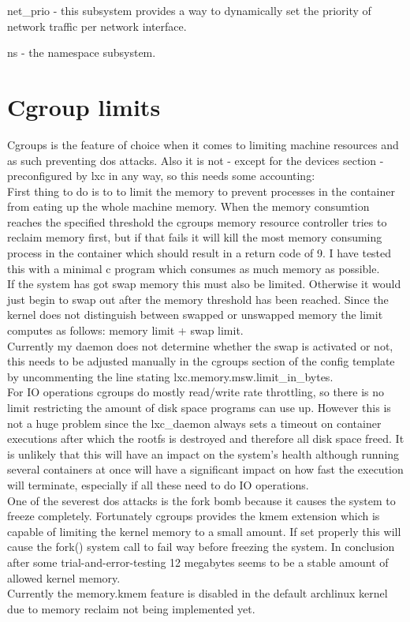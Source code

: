 net\_prio - this subsystem provides a way to dynamically set the priority of network traffic per network interface. 

ns - the namespace subsystem.\\
\cite{cgroups}

\section{Cgroup limits}

Cgroups is the feature of choice when it comes to limiting machine resources and as such preventing dos attacks.
Also it is not - except for the devices section - preconfigured by lxc in any way, so this needs some accounting:\\
First thing to do is to to limit the memory to prevent processes in the container from eating up the whole machine memory.
When the memory consumtion reaches the specified threshold the cgroups memory resource controller tries to reclaim memory first,
but if that fails it will kill the most memory consuming process in the container which should result in a return code of 9\cite{cgrpmem}.
I have tested this with a minimal c program which consumes as much memory as possible.\\
If the system has got swap memory this must also be limited. Otherwise it would just begin to swap out after the memory
threshold has been reached. Since the kernel does not distinguish between swapped or unswapped memory the limit computes as follows:
memory limit + swap limit.\\
Currently my daemon does not determine whether the swap is activated or not, this needs to be adjusted manually in the cgroups
section of the config template by uncommenting the line stating lxc.memory.msw.limit\_in\_bytes.\\
For IO operations cgroups do mostly read/write rate throttling, so there is no limit restricting the amount of disk space programs
can use up. However this is not a huge problem since the lxc\_daemon always sets a timeout on container executions after which the
rootfs is destroyed and therefore all disk space freed. It is unlikely that this will have an impact on the system's health although
running several containers at once will have a significant impact on how fast the execution will terminate, especially if all these
need to do IO operations.\\
One of the severest dos attacks is the fork bomb because it causes the system to freeze completely. Fortunately cgroups provides
the kmem extension which is capable of limiting the kernel memory to a small amount. If set properly this will cause the fork()
system call to fail way before freezing the system. In conclusion after some trial-and-error-testing 12 megabytes seems to be a
stable amount of allowed kernel memory.\\
Currently the memory.kmem feature is disabled in the default archlinux kernel due to memory reclaim not being implemented yet\cite{kmembug}.\\

